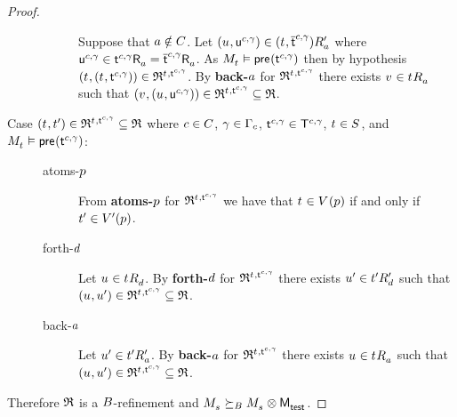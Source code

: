 \begin{proof}
\begin{description}
\begin{description}
                Suppose that $\agentA \notin \agentsC$.
                Let $(\kStateU, \aStateU[\agentC, \gamma]) \in \kSuccessorsPA{(\kStateT, \aPStateT[\agentC, \gamma])}$ where $\aStateU[\agentC, \gamma] \in \aSuccessorsA{\aStateT[\agentC, \gamma]} = \aSuccessorsA{\aPStateT[\agentC, \gamma]}$.
                As $\kPModel{\kStateT} \entails \aPrecondition(\aStateT[\agentC, \gamma])$ then by hypothesis $(\kStateT, (\kStateT, \aStateT[\agentC, \gamma])) \in \refinement^{\kStateT, \aStateT[\agentC, \gamma]}$.
                By {\bf back-$\agentA$} for $\refinement^{\kStateT, \aStateT[\agentC, \gamma]}$ there exists $\kStateV \in \kSuccessorsA{\kStateT}$ such that $(\kStateV, (\kStateU, \aStateU[\agentC, \gamma])) \in \refinement^{\kStateT, \aStateT[\agentC, \gamma]} \subseteq \refinement$.
        \end{description}
    \item[{Case $(\kStateT, \kStateTP) \in \refinement^{\kStateT, \aStateT[\agentC, \gamma]} \subseteq \refinement$ where $\agentC \in \agentsC$, $\gamma \in \Gamma_\agentC$, $\aStateT[\agentC, \gamma] \in \aStatesT[\agentC, \gamma]$, $\kStateT \in \kStates$, and $\kPModel{\kStateT} \entails \aPrecondition(\aStateT[\agentC, \gamma])$:}] \hfill
        \begin{description}
            \item[atoms-$\atomP$]
                From {\bf atoms-$\atomP$} for $\refinement^{\kStateT, \aStateT[\agentC, \gamma]}$ we have that $\kStateT \in \kValuation(\atomP)$ if and only if $\kStateTP \in \kValuationP(\atomP)$.
            \item[forth-$\agentD$]
                Let $\kStateU \in \kSuccessorsD{\kStateT}$.
                By {\bf forth-$\agentD$} for $\refinement^{\kStateT, \aStateT[\agentC, \gamma]}$ there exists $\kStateUP \in \kSuccessorsPD{\kStateTP}$ such that $(\kStateU, \kStateUP) \in \refinement^{\kStateT, \aStateT[\agentC, \gamma]} \subseteq \refinement$.
            \item[back-$\agentA$]
                Let $\kStateUP \in \kSuccessorsPA{\kStateTP}$.
                By {\bf back-$\agentA$} for $\refinement^{\kStateT, \aStateT[\agentC, \gamma]}$ there exists $\kStateU \in \kSuccessorsA{\kStateT}$ such that $(\kStateU, \kStateUP) \in \refinement^{\kStateT, \aStateT[\agentC, \gamma]} \subseteq \refinement$.
        \end{description}
\end{description}

Therefore $\refinement$ is a $\agentsB$-refinement and $\kPModel{\kStateS} \simulatesBs \kPModel{\kStateS} \exec \aPModel{\aStateTest}$.
\end{proof}

